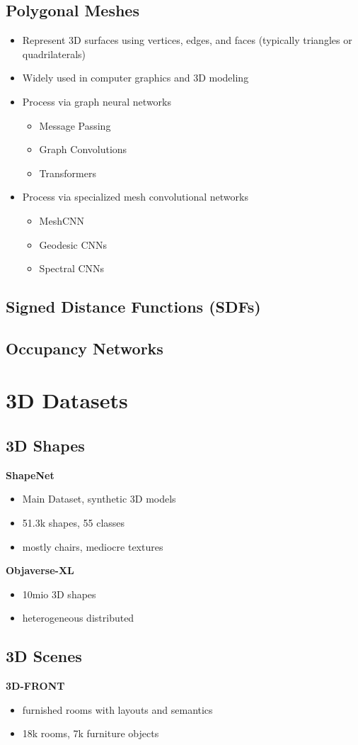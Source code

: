 \subsection{Polygonal Meshes}
\begin{itemize}
    \item Represent 3D surfaces using vertices, edges, and faces (typically triangles or quadrilaterals)
    \item Widely used in computer graphics and 3D modeling
    \item Process via graph neural networks \begin{itemize}
        \item Message Passing
        \item Graph Convolutions
        \item Transformers
    \end{itemize} 
    \item Process via specialized mesh convolutional networks \begin{itemize}
        \item MeshCNN
        \item Geodesic CNNs
        \item Spectral CNNs
    \end{itemize}
\end{itemize}
    



\subsection{Signed Distance Functions (SDFs)}

\subsection{Occupancy Networks}

\section{3D Datasets}

\subsection{3D Shapes}
\textbf{ShapeNet}
\begin{itemize}
    \item Main Dataset, synthetic 3D models
    \item 51.3k shapes, 55 classes
    \item mostly chairs, mediocre textures
\end{itemize}

\textbf{Objaverse-XL}
\begin{itemize}
    \item 10mio 3D shapes
    \item heterogeneous distributed
\end{itemize}

\subsection{3D Scenes}
\textbf{3D-FRONT}
\begin{itemize}
    \item furnished rooms with layouts and semantics
    \item 18k rooms, 7k furniture objects
\end{itemize}
